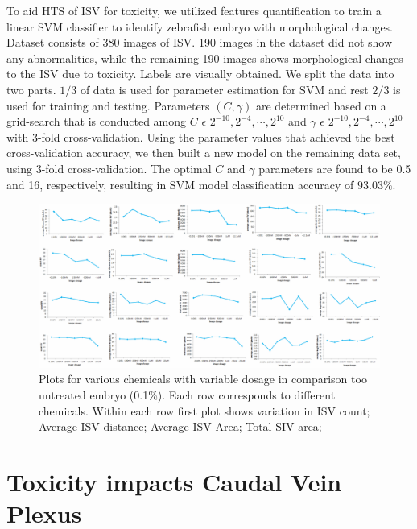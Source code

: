 To aid HTS of ISV for toxicity, we utilized features quantification to train a linear SVM classifier to identify zebrafish embryo with morphological changes. Dataset consists of 380 images of ISV. 190 images in the dataset did not show any abnormalities, while the remaining 190 images shows morphological changes to the ISV due to toxicity. Labels are visually obtained. We split the data into two parts. $1/3$ of data is used for parameter estimation for SVM and rest $2/3$ is used for training and testing. Parameters $(C, \gamma)$ are determined based on a grid-search that is conducted among $C$ $\epsilon$ ${2^{-10}, 2^{-4}, \cdots, 2^{10}}$ and $\gamma$ $\epsilon$ ${2^{-10}, 2^{-4}, \cdots, 2^{10}}$ with 3-fold cross-validation. Using the parameter values that achieved the best cross-validation accuracy, we then built a new model on the remaining data set, using 3-fold cross-validation. The optimal $C$ and $\gamma$ parameters are found to be 0.5 and 16, respectively, resulting in SVM model classification accuracy of $93.03\%$.

\begin{landscape}\centering
\begin{figure}[htb]
 \includegraphics[scale=0.45]{figure/analysisPlot.png}
\caption[ Effect of toxins on ISV morphology]{Plots for various chemicals with variable dosage in comparison too untreated embryo (0.1\%). Each row corresponds to different chemicals. Within each row first plot shows variation in ISV count; Average ISV distance; Average ISV Area; Total SIV area;}\label{isvplots}
\end{figure}
\end{landscape}


\section{Toxicity impacts Caudal Vein Plexus}\label{sec:cvpanalysis}

